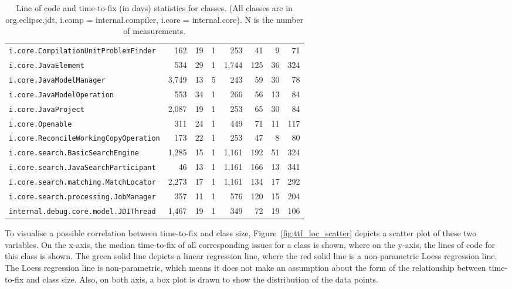 \begin{table}[!ht]
\begin{tabular}{lr|rrrrrr}
		\verb|i.core.CompilationUnitProblemFinder| & 162 & 19 & 1 & 253 & 41 & 9 & 71 \\
		\verb|i.core.JavaElement| & 534 & 29 & 1 & 1,744 & 125 & 36 & 324 \\
		\verb|i.core.JavaModelManager| & 3,749 & 13 & 5 & 243 & 59 & 30 & 78 \\
		\verb|i.core.JavaModelOperation| & 553 & 34 & 1 & 266 & 56 & 13 & 84 \\
		\verb|i.core.JavaProject| & 2,087 & 19 & 1 & 253 & 65 & 30 & 84 \\
		\verb|i.core.Openable| & 311 & 24 & 1 & 449 & 71 & 11 & 117 \\
		\verb|i.core.ReconcileWorkingCopyOperation| & 173 & 22 & 1 & 253 & 47 & 8 & 80 \\
		\verb|i.core.search.BasicSearchEngine| & 1,285 & 15 & 1 & 1,161 & 192 & 51 & 324 \\
		\verb|i.core.search.JavaSearchParticipant| & 46 & 13 & 1 & 1,161 & 166 & 13 & 341 \\
		\verb|i.core.search.matching.MatchLocator| & 2,273 & 17 & 1 & 1,161 & 134 & 17 & 292 \\
		\verb|i.core.search.processing.JobManager| & 357 & 11 & 1 & 576 & 120 & 15 & 204 \\
		\verb|internal.debug.core.model.JDIThread| & 1,467 & 19 & 1 & 349 & 72 & 19 & 106 \\
		\bottomrule
	\end{tabular} 
	\caption{Line of code and time-to-fix (in days) statistics for classes. (All classes are in org.eclipse.jdt, i.comp = internal.compiler, i.core = internal.core). N is the number of measurements.}
	\label{tab:ttf_loc_stats}
\end{table}

To visualise a possible correlation between time-to-fix and class size, Figure~\ref{fig:ttf_loc_scatter} depicts a scatter plot of these two variables. On the x-axis, the median time-to-fix of all corresponding issues for a class is shown, where on the y-axis, the lines of code for this class is shown. The green solid line depicts a linear regression line, where the red solid line is a non-parametric Loess \cite{Cleveland1979,Cleveland1988} regression line. The Loess regression line is non-parametric, which means it does not make an assumption about the form of the relationship between time-to-fix and class size. Also, on both axis, a box plot is drawn to show the distribution of the data points.


